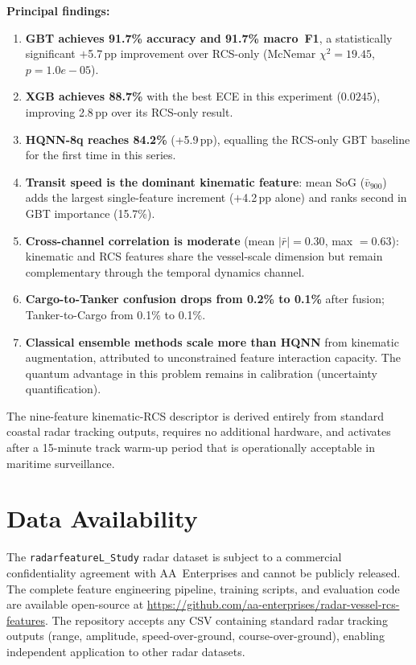 \documentclass[journal]{IEEEtran}
\begin{document}
\medskip\noindent\textbf{Principal findings:}
\begin{enumerate}
\item \textbf{GBT achieves 91.7\% accuracy and 91.7\% macro~F1},
  a statistically significant $+$5.7\,pp improvement over RCS-only
  (McNemar $\chi^2 = 19.45$, $p = 1.0e-05$).
\item \textbf{XGB achieves 88.7\%} with the best ECE in this
  experiment ($0.0245$), improving 2.8\,pp over its RCS-only result.
\item \textbf{HQNN-8q reaches 84.2\%} (+5.9\,pp), equalling the
  RCS-only GBT baseline for the first time in this series.
\item \textbf{Transit speed is the dominant kinematic feature}: mean
  SoG ($\bar{v}_{900}$) adds the largest single-feature increment
  ($+$4.2\,pp alone) and ranks second in GBT importance (15.7\%).
\item \textbf{Cross-channel correlation is moderate} (mean
  $|\bar{r}| = 0.30$, max $= 0.63$): kinematic and RCS
  features share the vessel-scale dimension but remain complementary
  through the temporal dynamics channel.
\item \textbf{Cargo-to-Tanker confusion drops from 0.2\% to
  0.1\%} after fusion; Tanker-to-Cargo from 0.1\% to 0.1\%.
\item \textbf{Classical ensemble methods scale more than HQNN}
  from kinematic augmentation, attributed to unconstrained feature
  interaction capacity. The quantum advantage in this problem remains
  in calibration (uncertainty quantification).
\end{enumerate}

The nine-feature kinematic-RCS descriptor is derived entirely from
standard coastal radar tracking outputs, requires no additional
hardware, and activates after a 15-minute track warm-up period that
is operationally acceptable in maritime surveillance.

\section*{Data Availability}
The \texttt{radarfeatureL\_Study} radar dataset is subject to a
commercial confidentiality agreement with AA~Enterprises and cannot
be publicly released. The complete feature engineering pipeline,
training scripts, and evaluation code are available open-source at
\url{https://github.com/aa-enterprises/radar-vessel-rcs-features}.
The repository accepts any CSV containing standard radar tracking
outputs (range, amplitude, speed-over-ground, course-over-ground),
enabling independent application to other radar datasets.
\end{document}
